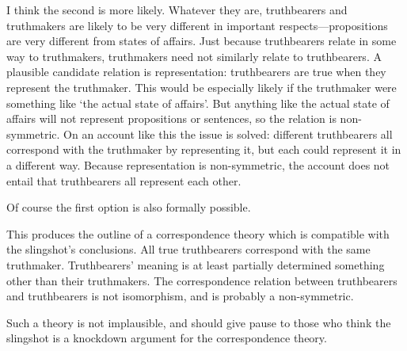 I think the second is more likely.
Whatever they are, truthbearers and truthmakers are likely to be very different in important respects---propositions are very different from states of affairs.
Just because truthbearers relate in some way to truthmakers, truthmakers need not similarly relate to truthbearers.
A plausible candidate relation is representation: truthbearers are true when they represent the truthmaker.
This would be especially likely if the truthmaker were something like `the actual state of affairs'.
But anything like the actual state of affairs will not represent propositions or sentences, so the relation is non-symmetric.
On an account like this the issue is solved: different truthbearers all correspond with the truthmaker by representing it, but each could represent it in a different way.
Because representation is non-symmetric, the account does not entail that truthbearers all represent each other.

Of course the first option is also formally possible.

This produces the outline of a correspondence theory which is compatible with the slingshot's conclusions.
All true truthbearers correspond with the same truthmaker.
Truthbearers' meaning is at least partially determined something other than their truthmakers.
The correspondence relation between truthbearers and truthbearers is not isomorphism, and is probably a non-symmetric.

Such a theory is not implausible, and should give pause to those who think the slingshot is a knockdown argument for the correspondence theory.
